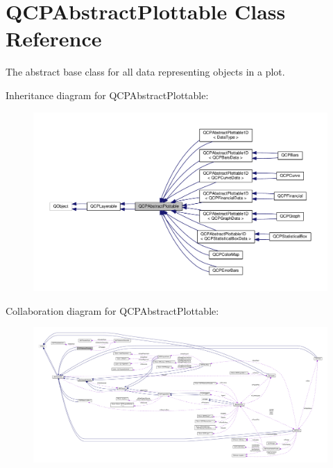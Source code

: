 \hypertarget{class_q_c_p_abstract_plottable}{}\section{Q\+C\+P\+Abstract\+Plottable Class Reference}
\label{class_q_c_p_abstract_plottable}


The abstract base class for all data representing objects in a plot.  




Inheritance diagram for Q\+C\+P\+Abstract\+Plottable\+:\nopagebreak
\begin{figure}[H]
\begin{center}
\leavevmode
\includegraphics[width=350pt]{class_q_c_p_abstract_plottable__inherit__graph}
\end{center}
\end{figure}


Collaboration diagram for Q\+C\+P\+Abstract\+Plottable\+:\nopagebreak
\begin{figure}[H]
\begin{center}
\leavevmode
\includegraphics[width=350pt]{class_q_c_p_abstract_plottable__coll__graph}
\end{center}
\end{figure}
